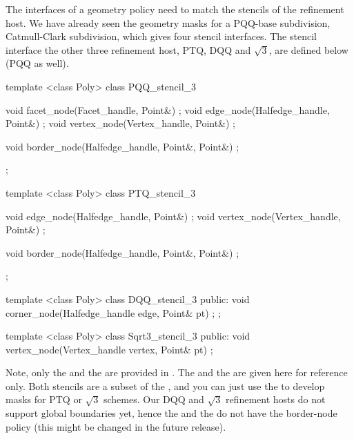 The interfaces of a geometry policy need to match the stencils of 
the refinement host. We have already seen the geometry masks for
a PQQ-base subdivision, Catmull-Clark subdivision, which gives
four stencil interfaces. The stencil interface the other three 
refinement host, PTQ, DQQ and $\sqrt{3}$, are defined below 
(PQQ as well).


\begin{ccExampleCode}
template <class Poly>
class PQQ_stencil_3 {
  void facet_node(Facet_handle, Point&) {};
  void edge_node(Halfedge_handle, Point&) {};
  void vertex_node(Vertex_handle, Point&) {};

  void border_node(Halfedge_handle, Point&, Point&) {};
};

template <class Poly>
class PTQ_stencil_3 {
  void edge_node(Halfedge_handle, Point&) {};
  void vertex_node(Vertex_handle, Point&) {};

  void border_node(Halfedge_handle, Point&, Point&) {};
};

template <class Poly>
class DQQ_stencil_3 {
public:
  void corner_node(Halfedge_handle edge, Point& pt) {};
};

template <class Poly>
class Sqrt3_stencil_3 {
public:
  void vertex_node(Vertex_handle vertex, Point& pt) {}
};
\end{ccExampleCode}

Note, only the  and the 
are provided in .
The  and the  are given
here for reference only. Both stencils are a subset of the
, and you can just use the 
 to develop masks for PTQ or $\sqrt{3}$ 
schemes. Our DQQ and $\sqrt{3}$ refinement hosts do
not support global boundaries yet, hence the
 and the  do not
have the border-node policy (this might be changed in the 
future release). 



